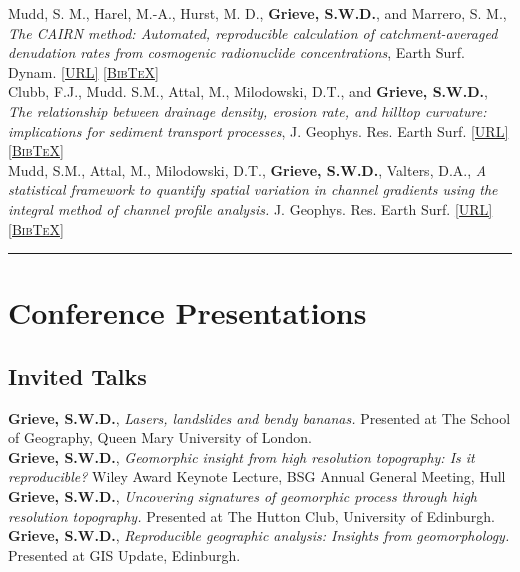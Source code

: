 \documentclass[10pt, a4paper]{article}
\newcommand{\doi}[1]{\href{https://dx.doi.org/#1}{\scriptsize\textsc{[URL]}}}
\newcommand{\bib}[1]{\href{https://www.doi2bib.org/bib/#1}{\scriptsize\textsc{[BibTeX]}}}
\newcommand{\paperlinks}[1]{\doi{#1} \bib{#1}}
\newcommand{\years}[1]{\marginnote{\scriptsize #1}}
\begin{document}
\years{2016}Mudd, S. M., Harel, M.-A., Hurst, M. D., \textbf{Grieve, S.W.D.}, and Marrero, S. M., \textit{The CAIRN method: Automated, reproducible calculation of catchment-averaged denudation rates from cosmogenic radionuclide concentrations}, Earth Surf. Dynam. \paperlinks{10.5194/esurf-4-655-2016}\\[0.05cm]

\years{2016}Clubb, F.J., Mudd. S.M., Attal, M., Milodowski, D.T., and \textbf{Grieve, S.W.D.}, \textit{The relationship between drainage density, erosion rate, and hilltop curvature: implications for sediment transport processes}, J. Geophys. Res. Earth Surf. \paperlinks{10.1002/2015JF003747}\\[0.05cm]

\years{2014}Mudd, S.M., Attal, M., Milodowski, D.T., \textbf{Grieve, S.W.D.}, Valters, D.A., \textit{A statistical framework to quantify spatial variation in channel gradients using the integral method of channel profile analysis.} J. Geophys. Res. Earth Surf. \paperlinks{10.1002/2013JF002981}\\[0.05cm]

\hrule
\section*{Conference Presentations}

\subsection*{Invited Talks}

\years{2019}\textbf{Grieve, S.W.D.}, \textit{Lasers, landslides and bendy bananas.} Presented at The School of Geography, Queen Mary University of London.\\[0.05cm]

\years{2017}\textbf{Grieve, S.W.D.}, \textit{Geomorphic insight from high resolution topography: Is it reproducible?} Wiley Award Keynote Lecture, BSG Annual General Meeting, Hull\\[0.05cm]

\years{2016}\textbf{Grieve, S.W.D.}, \textit{Uncovering signatures of geomorphic process through high resolution topography.} Presented at The Hutton Club, University of Edinburgh.\\[0.05cm]

\years{2015}\textbf{Grieve, S.W.D.}, \textit{Reproducible geographic analysis: Insights from geomorphology.} Presented at GIS Update, Edinburgh.\\[0.05cm]
\end{document}

